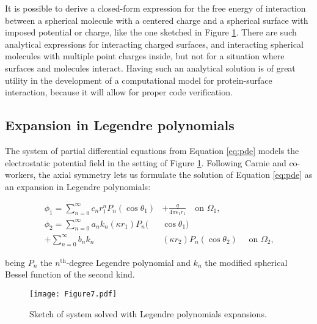 
It is possible to derive a closed-form expression for the free energy of interaction between a spherical molecule with a centered charge and a spherical surface with imposed potential or charge, like the one sketched in Figure \ref{fig:twosphere_an}.  There are such analytical expressions for interacting charged surfaces,\cite{CarnieChanGunning1994} and interacting spherical molecules with multiple point charges inside,\cite{LotanHead-Gordon2006} but not for a situation where surfaces and molecules interact. Having such an analytical solution is of great utility in the development of a computational model for protein-surface interaction, because it will allow for proper code verification. 


\subsection{Expansion in Legendre polynomials} \label{sec:expansion_analytical}


The system of partial differential equations from Equation \eqref{eq:pde}  models the electrostatic potential field in the setting of Figure \ref{fig:twosphere_an}. Following Carnie and co-workers, \cite{CarnieChanGunning1994} the axial symmetry lets us formulate the solution of Equation \eqref{eq:pde} as an expansion in Legendre polynomials:
 

\begin{align} \label{eq:derivation1}
\phi_1 = \sum_{n=0}^{\infty} c_n r_1^n P_n(\cos \theta_1) & + \frac{q}{4\pi\epsilon_1 r_1} \quad \text{on $\Omega_1$,} \nonumber \\
\phi_2 = \sum_{n=0}^{\infty} a_n k_n(\kappa r_1) P_n (& \cos \theta_1) \nonumber \\
+ \sum_{n=0}^{\infty} b_n k_n & (\kappa r_2) P_n(\cos \theta_2) \quad \text{ on $\Omega_2$,}
\end{align}

\noindent being $P_n$ the $n^{\text{th}}$-degree Legendre polynomial and $k_n$ the modified spherical Bessel function of the second kind. 

 

\begin{figure}%
   \centering
   \texttt{[image: Figure7.pdf]} 
   \caption{Sketch of system solved with Legendre polynomials expansions.}
   \label{fig:twosphere_an}
\end{figure}
 

